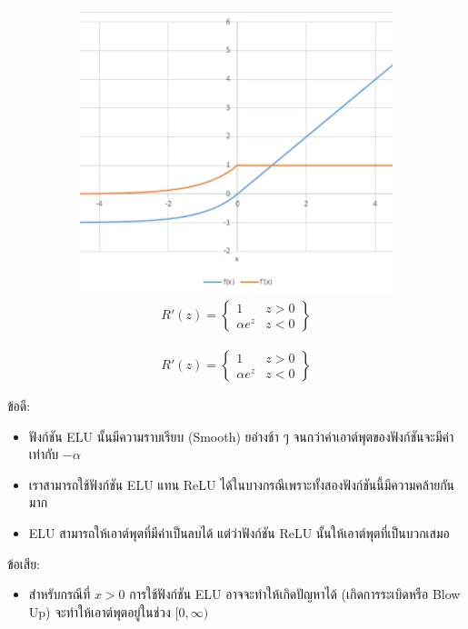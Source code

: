 \begin{itemize}
\begin{figure}[H]
\begin{subfigure}{0.5\textwidth}
            \includegraphics[width=0.9\linewidth]{fig/actfunc_elu_der.png}
            \caption{%
                \begin{equation}
                    \begin{split}R'(z) = \begin{Bmatrix} 1 & z>0 \\
                        \alpha e^z & z<0 \end{Bmatrix}\end{split}
                \end{equation}
            }
            \label{fig:actfunc_elu_der}
        \end{subfigure}
    \end{figure}
    ข้อดี:
    \begin{itemize}
        \item ฟังก์ชัน ELU นั้นมีความราบเรียบ (Smooth) ยอ่างช้า ๆ จนกว่าค่าเอาต์พุตของฟังก์ชันจะมีค่าเท่ากับ $-\alpha$
        
        \item เราสามารถใช้ฟังก์ชัน ELU แทน ReLU ได้ในบางกรณีเพราะทั้งสองฟังก์ชันนี้มีความคล้ายกันมาก
        
        \item ELU สามารถให้เอาต์พุตที่มีค่าเป็นลบได้ แต่ว่าฟังก์ชัน ReLU นั้นให้เอาต์พุตที่เป็นบวกเสมอ
    \end{itemize}
    ข้อเสีย:
    \begin{itemize}
        \item สำหรับกรณีที่ $x > 0$ การใช้ฟังก์ชัน ELU อาจจะทำให้เกิดปัญหาได้ (เกิดการระเบิดหรือ Blow Up) จะทำให้เอาต์พุตอยู่ในช่วง 
        $[0,\infty)$
    \end{itemize}


\end{itemize}

